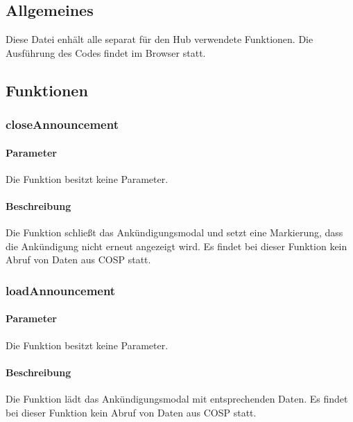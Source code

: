 \subsection{Allgemeines} Diese Datei enhält alle separat für den Hub verwendete Funktionen.
Die Ausführung des Codes findet im Browser statt.
\subsection{Funktionen}
\subsubsection{closeAnnouncement}
\paragraph{Parameter} Die Funktion besitzt keine Parameter.
\paragraph{Beschreibung} Die Funktion schließt das Ankündigungsmodal und setzt eine Markierung, dass die Ankündigung nicht erneut angezeigt wird. Es findet bei dieser Funktion kein Abruf von Daten aus {\glqq COSP\grqq} statt.
\subsubsection{loadAnnouncement}
\paragraph{Parameter} Die Funktion besitzt keine Parameter.
\paragraph{Beschreibung} Die Funktion lädt das Ankündigungsmodal mit entsprechenden Daten. Es findet bei dieser Funktion kein Abruf von Daten aus {\glqq COSP\grqq} statt.